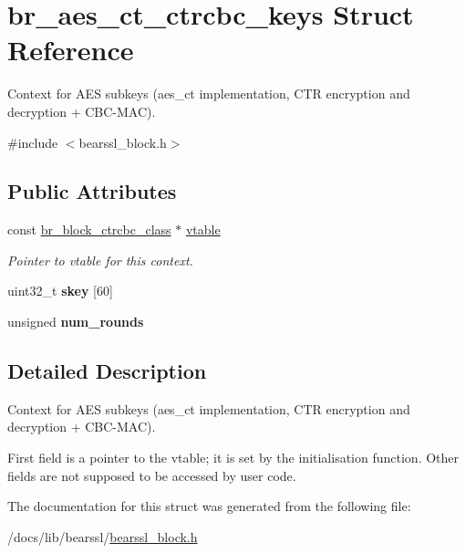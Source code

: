 \hypertarget{structbr__aes__ct__ctrcbc__keys}{}\section{br\+\_\+aes\+\_\+ct\+\_\+ctrcbc\+\_\+keys Struct Reference}
\label{structbr__aes__ct__ctrcbc__keys}


Context for A\+ES subkeys ({\ttfamily aes\+\_\+ct} implementation, C\+TR encryption and decryption + C\+B\+C-\/\+M\+AC).  




{\ttfamily \#include $<$bearssl\+\_\+block.\+h$>$}

\subsection*{Public Attributes}
\begin{DoxyCompactItemize}
\item 
\mbox{\label{structbr__aes__ct__ctrcbc__keys_a52cf447acb37c8b1b2e017169d69bb44}} 
const \hyperlink{bearssl__block_8h_acc35dad952fda67b68df0b107fe26f0b}{br\+\_\+block\+\_\+ctrcbc\+\_\+class} $\ast$ \hyperlink{structbr__aes__ct__ctrcbc__keys_a52cf447acb37c8b1b2e017169d69bb44}{vtable}
\begin{DoxyCompactList}\small\item\em Pointer to vtable for this context. \end{DoxyCompactList}\item 
\mbox{\label{structbr__aes__ct__ctrcbc__keys_ac45195edf2859e08eca3f8c63bbf9a55}} 
uint32\+\_\+t {\bfseries skey} \mbox{[}60\mbox{]}
\item 
\mbox{\label{structbr__aes__ct__ctrcbc__keys_a7fb2803570fd4447e0453d3d8eb832dd}} 
unsigned {\bfseries num\+\_\+rounds}
\end{DoxyCompactItemize}


\subsection{Detailed Description}
Context for A\+ES subkeys ({\ttfamily aes\+\_\+ct} implementation, C\+TR encryption and decryption + C\+B\+C-\/\+M\+AC). 

First field is a pointer to the vtable; it is set by the initialisation function. Other fields are not supposed to be accessed by user code. 

The documentation for this struct was generated from the following file\+:\begin{DoxyCompactItemize}
\item 
/docs/lib/bearssl/\hyperlink{bearssl__block_8h}{bearssl\+\_\+block.\+h}\end{DoxyCompactItemize}
